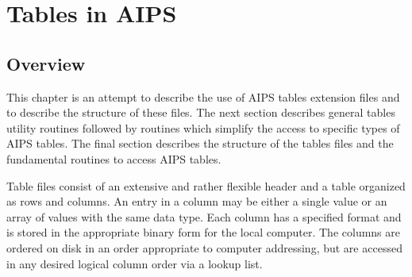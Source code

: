 \setcounter{chapter}{12} %
\chapter{Tables in AIPS}
\setcounter{page}{1}
\section{Overview }
This chapter is an attempt to describe the use of AIPS tables
extension files and to describe the structure of these files. The
next section describes general tables utility routines followed by
routines which simplify the access to specific types of AIPS tables.
The final section describes the structure of the tables files and the
fundamental routines to access AIPS tables.

Table files consist of an extensive and rather flexible header and a
table organized as rows and columns.  An entry in a column may be
either a single value or an array of values with the same data type.
Each column has a specified format and is stored in the appropriate
binary form for the local computer.  The columns are ordered on disk
in an order appropriate to computer addressing, but are accessed in
any desired logical column order via a lookup list.

